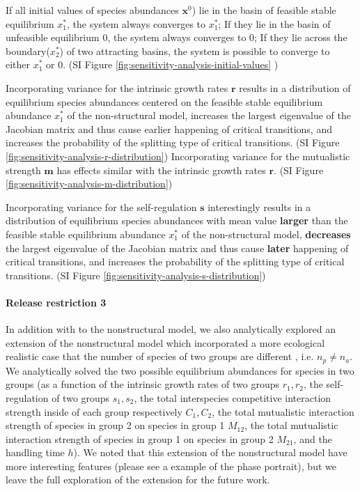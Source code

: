 \documentclass[a4paper,fleqn,12pt]{article}
\begin{document}
If all initial values of species abundances $\mathbf{x}^0$) lie in the basin of feasible stable equilibrium $x^*_1$,
the system always converges to $x^*_1$;
If they lie in the basin of unfeasible equilibrium $0$, the system always converges to $0$;
If they lie across the boundary($x^*_2$) of two attracting basins, the system is possible to converge to either $x^*_1$ or $0$.
(SI Figure \ref{fig:sensitivity-analysis-initial-values} )

Incorporating variance for the intrinsic growth rates $\mathbf{r}$ results in a distribution of equilibrium species abundances centered on the feasible stable equilibrium abundance $x^*_1$ of the non-structural model,
increases the largest eigenvalue of the Jacobian matrix and thus cause earlier happening of critical transitions,
and increases the probability of the splitting type of critical transitions.
(SI Figure \ref{fig:sensitivity-analysis-r-distribution})
Incorporating variance for the mutualistic strength $\mathbf{m}$ has effects  similar with the intrinsic growth rates $\mathbf{r}$.
(SI Figure \ref{fig:sensitivity-analysis-m-distribution})

Incorporating variance for the self-regulation $\mathbf{s}$ interestingly results in a distribution of equilibrium species abundances with mean value \textbf{larger} than the feasible stable equilibrium abundance $x^*_1$ of the non-structural model,
\textbf{decreases} the largest eigenvalue of the Jacobian matrix and thus cause \textbf{later} happening of critical transitions,
and increases the probability of the splitting type of critical transitions.
(SI Figure \ref{fig:sensitivity-analysis-s-distribution})

\paragraph*{Release restriction 3}
In addition with to the nonstructural model,
we also analytically explored an extension of the nonstructural model which incorporated a more ecological realistic case that the number of species of two groups are different , i.e. $n_p \neq n_a$.
We analytically solved the two possible equilibrium abundances for species in two groups
(as a function of the intrinsic growth rates of two groups $r_1,r_2$,
the self-regulation of two groups $s_1, s_2$,
the total interspecies competitive interaction strength inside of each group respectively $C_1,C_2$,
the total mutualistic interaction strength of species in group 2 on species in group 1 $M_{12}$,
the total mutualistic interaction strength of species in group 1 on species in group 2 $M_{21}$,
and the handling time $h$).
We noted that this extension of the nonstructural model have more interesting features (please see a example of the phase portrait),
but we leave the full exploration of the extension for the future work.
\end{document}
